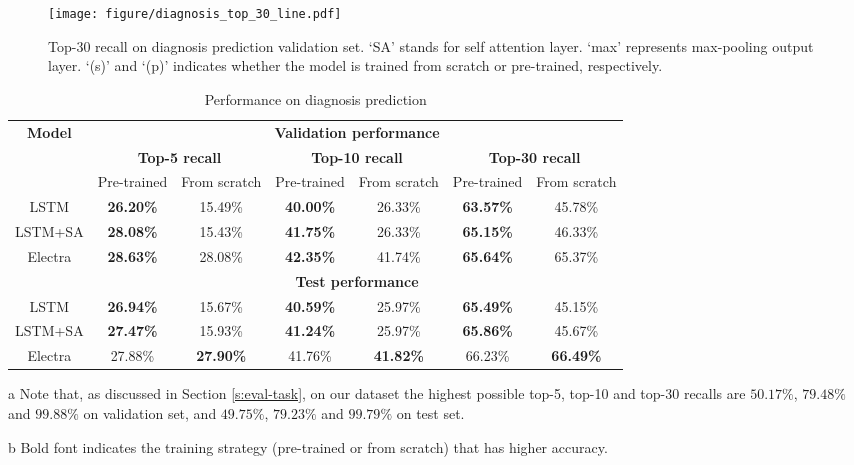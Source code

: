 \documentclass[11pt,a4paper]{article}
\begin{document}
\begin{figure}[hp]
    \centering
    \texttt{[image: figure/diagnosis\_top\_30\_line.pdf]}
    \caption{Top-30 recall on diagnosis prediction validation set. `SA' stands for self attention layer. `max' represents max-pooling output layer. `(s)' and `(p)' indicates whether the model is trained from scratch or pre-trained, respectively.}
    \label{fig:top-30-line}
\end{figure}

\begin{table*}[ht]
\centering
\begin{threeparttable}
\begin{tabular}{|c|c|c|c|c|c|c|}
\hline
\multirow{2}{*}{\textbf{Model}} & \multicolumn{6}{c|}{\textbf{Validation performance}} \\ \cline{2-7} 
 & \multicolumn{2}{c|}{\textbf{Top-5 recall}} & \multicolumn{2}{c|}{\textbf{Top-10 recall}} & \multicolumn{2}{c|}{\textbf{Top-30 recall}} \\ \hline
 & Pre-trained & From scratch & Pre-trained & From scratch & Pre-trained & From scratch \\ \hline
LSTM & \textbf{26.20\%} & 15.49\% & \textbf{40.00\%} & 26.33\% & \textbf{63.57\%} & 45.78\% \\ \hline
LSTM+SA & \textbf{28.08\%} & 15.43\% & \textbf{41.75\%} & 26.33\% & \textbf{65.15\%} & 46.33\% \\ \hline
Electra & \textbf{28.63\%} & 28.08\% & \textbf{42.35\%} & 41.74\% & \textbf{65.64\%} & 65.37\% \\ \hline
& \multicolumn{6}{c|}{\textbf{Test performance}} \\ \hline
LSTM & \textbf{26.94\%} & 15.67\% & \textbf{40.59\%} & 25.97\% & \textbf{65.49\%} & 45.15\% \\ \hline
LSTM+SA & \textbf{27.47\%} & 15.93\% & \textbf{41.24\%} & 25.97\% & \textbf{65.86\%} & 45.67\% \\ \hline
Electra & 27.88\% & \textbf{27.90\%} & 41.76\% & \textbf{41.82\%} & 66.23\% & \textbf{66.49\%} \\ \hline
\end{tabular}
\caption{Performance on diagnosis prediction}
\label{tab:diag-recalls}
\begin{tablenotes}
\small
\item[a] Note that, as discussed in Section \ref{s:eval-task}, on our dataset the highest possible top-5, top-10 and top-30 recalls are $50.17\%$, $79.48\%$ and $99.88\%$ on validation set, and $49.75\%$, $79.23\%$ and $99.79\%$ on test set.
\item[b] Bold font indicates the training strategy (pre-trained or from scratch) that has higher accuracy.
\end{tablenotes}
\end{threeparttable}
\end{table*}
\end{document}

